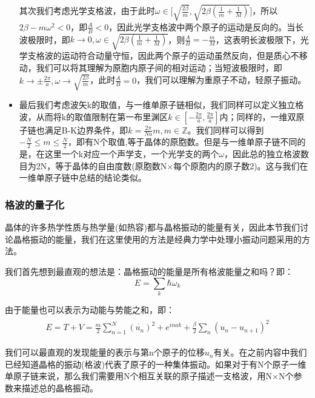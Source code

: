 \documentclass{ctexart}
\begin{document}
\begin{itemize}
                其次我们考虑光学支格波，由于此时$\omega\in\Big[\sqrt{\frac{2\beta}{m}},\sqrt{2\beta(\frac{1}{m}+\frac{1}{M})}\Big]$，所以$2\beta-m\omega^2<0$，即$\frac{A}{B}<0$，因此光学支格波中两个原子的运动是反向的。当长波极限时，即$k\rightarrow 0,\omega\in\sqrt{2\beta(\frac{1}{m}+\frac{1}{M})}$，则$\frac{A}{B}=-\frac{m}{M}$，这表明长波极限下，光学支格波的运动符合动量守恒，因此两个原子的运动虽然反向，但是质心不移动，我们可以将其理解为原胞内原子间的相对运动；当短波极限时，即$k\rightarrow\pm\frac{2\pi}{a},\omega\rightarrow \sqrt{\frac{2\beta}{m}}$，此时$\frac{A}{B}=0$，我们可以理解为重原子不动，轻原子振动。
                \item 最后我们考虑波矢k的取值，与一维单原子链相似，我们同样可以定义独立格波，从而将k的取值限制在第一布里渊区$k\in[-\frac{2\pi}{a},\frac{2\pi}{a}]$内；同样的，一维双原子链也满足B-K边界条件，即$k=\frac{2\pi}{Na}m,m\in\mathbb{Z}$。我们同样可以得到$-\frac{N}{2}\leq m\leq \frac{N}{2}$，即有N个取值,等于晶体的原胞数。但是与一维单原子链不同的是，在这里一个k对应一个声学支，一个光学支的两个$\omega$，因此总的独立格波数目为2N，等于晶体的自由度数(原胞数N$\times$每个原胞内的原子数2)。这与我们在一维单原子链中总结的结论类似。
                \end{itemize}
            
            \subsubsection{格波的量子化}
            晶体的许多热学性质与热学量(如热容)都与晶格振动的能量有关，因此本节我们讨论晶格振动的能量，我们在这里使用的方法是经典力学中处理小振动问题采用的方法。
            
            我们首先想到最直观的想法是：晶格振动的能量是所有格波能量之和吗？即：
            \begin{equation}
                E=\sum_k \hbar\omega_k
            \end{equation}
        
            由于能量也可以表示为动能与势能之和，即：
            \begin{align}
                \begin{split}
                    E=T+V=\frac{m}{2}\sum_{n=1}^{N}(\dot{u_n})^2+e^{inak}+\frac{\beta}{2}\sum_{n}(u_n-u_{n+1})^2
                \end{split}
            \end{align}
    
            我们可以最直观的发现能量的表示与第n个原子的位移$u_n$有关。在之前内容中我们已经知道晶格的振动(格波)代表了原子的一种集体振动。如果对于有N个原子一维单原子链来说，那么我们需要用N个相互关联的原子描述一支格波，用N$\times$N个参数来描述总的晶格振动。
            
\end{document}
